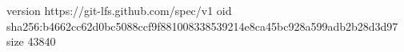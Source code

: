 version https://git-lfs.github.com/spec/v1
oid sha256:b4662cc62d0bc5088ccf9f881008338539214e8ca45bc928a599adb2b28d3d97
size 43840
